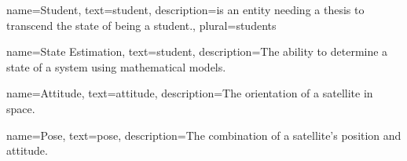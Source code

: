 {
	name=Student,
	text=student,
	description={is an entity needing a thesis to transcend the state of being a student.},
	plural=students
}

{
	name=State Estimation,
	text=student,
	description={The ability to determine a state of a system using mathematical models.}
}

{ 
	name=Attitude,
	text=attitude,
	description={The orientation of a satellite in space.}
}

{
	name=Pose,
	text=pose,
	description={The combination of a satellite's position and attitude.}
}